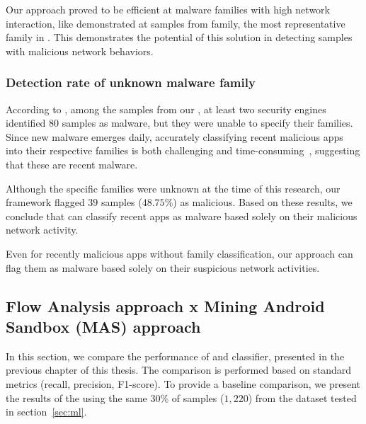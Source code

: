 \begin{finding}

Our approach proved to be efficient at malware families with high network interaction, like demonstrated at samples from \gps family, the most representative family in \fds. This demonstrates the potential of this solution in detecting samples with malicious network behaviors.

\end{finding}


\subsubsection{Detection rate of unknown malware family}\label{sec:unknowfamily}

According to \vt, among the samples from our \fds, at least two security engines identified $80$ samples as malware, but they were unable to specify their families. Since new malware emerges daily, accurately classifying recent malicious apps into their respective families is both challenging and time-consuming~\cite{DBLP:journals/compsec/WangTW21,DBLP:journals/compsec/ContiKP22}, suggesting that these are recent malware.

Although the specific families were unknown at the time of this research, our framework flagged $39$ samples ($48.75\%$) as malicious. Based on these results, we conclude that \droidxpflow can classify recent apps as malware based solely on their malicious network activity.

\begin{finding}

Even for recently malicious apps without family classification, our approach can flag them as malware based solely on their suspicious network activities.

\end{finding}



\subsection{Flow Analysis approach x Mining Android Sandbox (MAS) approach}\label{sec:new-mas-approach}


In this section, we compare the performance of \droidxpflow and \mas classifier, presented in the previous chapter of this thesis. The comparison is performed based on standard metrics (recall, precision, F1-score). To provide a baseline comparison, we present the results of the \mas using the same $30\%$ of samples ($1,220$) from the \fds dataset tested in section~\ref{sec:ml}.

